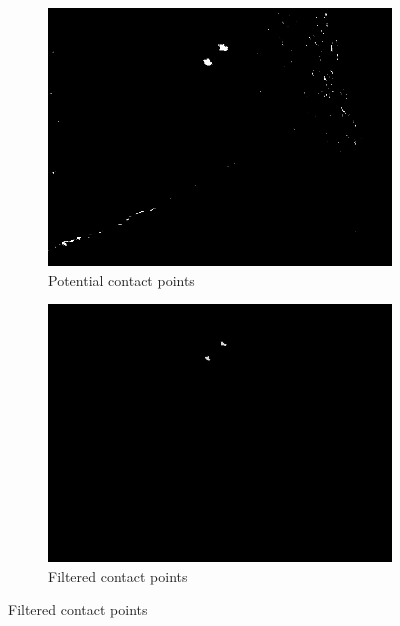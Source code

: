 \begin{figure}[htb]
      \vspace{1em}

        \begin{subfigure}[b]{0.31\textwidth}
                \includegraphics[width=\textwidth]{images/software/no_touch/initalDiffImage.jpg}
                \caption{Potential contact points}
                \label{img:cpT}
        \end{subfigure}
     \hfill
        \begin{subfigure}[b]{0.31\textwidth}
                \includegraphics[width=\textwidth]{images/software/no_touch/filteredDiffImage.jpg}
                \caption{Filtered contact points}
                \label{img:fcpT}
        \end{subfigure}

\end{figure}
